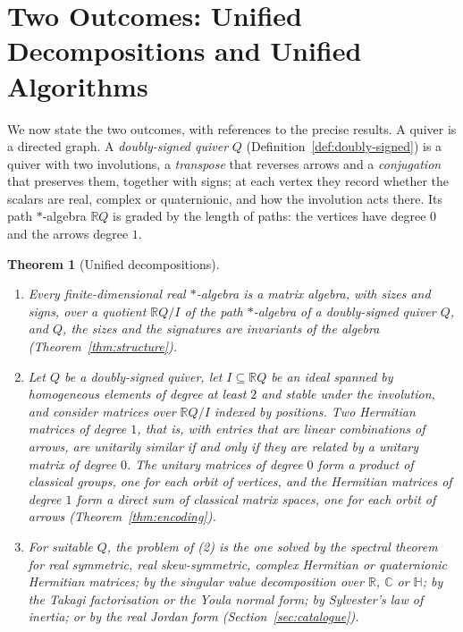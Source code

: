 \documentclass[12pt, a4paper]{report}
\theoremstyle{plain}
\theoremstyle{definition}
\theoremstyle{remark}
\theoremstyle{plain}
\newtheorem{mainthm}{Theorem}
\newcommand{\RR}{\mathbb{R}}
\newcommand{\CC}{\mathbb{C}}
\newcommand{\HH}{\mathbb{H}}
\begin{document}
\section{Two Outcomes: Unified Decompositions and Unified Algorithms}
\label{sec:outcomes}
We now state the two outcomes, with references to the precise results. A quiver is a directed graph. A \emph{doubly-signed quiver} $Q$ (Definition~\ref{def:doubly-signed}) is a quiver with two involutions, a \emph{transpose} that reverses arrows and a \emph{conjugation} that preserves them, together with signs; at each vertex they record whether the scalars are real, complex or quaternionic, and how the involution acts there. Its path $*$-algebra $\RR Q$ is graded by the length of paths: the vertices have degree $0$ and the arrows degree $1$.

\begin{mainthm}[Unified decompositions]\label{thm:A}
\leavevmode
\begin{enumerate}
  \item Every finite-dimensional real $*$-algebra is a matrix algebra, with sizes and signs, over a quotient $\RR Q/I$ of the path $*$-algebra of a doubly-signed quiver $Q$, and $Q$, the sizes and the signatures are invariants of the algebra (Theorem~\ref{thm:structure}).
  \item Let $Q$ be a doubly-signed quiver, let $I\subseteq\RR Q$ be an ideal spanned by homogeneous elements of degree at least $2$ and stable under the involution, and consider matrices over $\RR Q/I$ indexed by positions. Two Hermitian matrices of degree $1$, that is, with entries that are linear combinations of arrows, are unitarily similar if and only if they are related by a unitary matrix of degree $0$. The unitary matrices of degree $0$ form a product of classical groups, one for each orbit of vertices, and the Hermitian matrices of degree $1$ form a direct sum of classical matrix spaces, one for each orbit of arrows (Theorem~\ref{thm:encoding}).
  \item For suitable $Q$, the problem of (2) is the one solved by the spectral theorem for real symmetric, real skew-symmetric, complex Hermitian or quaternionic Hermitian matrices; by the singular value decomposition over $\RR$, $\CC$ or $\HH$; by the Takagi factorisation or the Youla normal form; by Sylvester's law of inertia; or by the real Jordan form (Section~\ref{sec:catalogue}).
\end{enumerate}
\end{mainthm}
\end{document}
